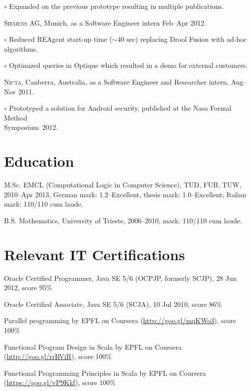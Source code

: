 \documentclass[letterpaper]{article}
\renewenvironment{itemize}{
  \begin{list}{}{
    \setlength{\leftmargin}{1.5em}
  }
}{
  \end{list}
}
\newenvironment{no-indent-itemize}{
  \begin{list}{}{
    \setlength{\leftmargin}{0em}
  }
}{
  \end{list}
}
\def\tilde{$\scriptstyle\sim$}
\def\bullet{$\circ$\xspace}
\begin{document}
\begin{no-indent-itemize}
\begin{itemize}
	 \item\bullet Expanded on the previous prototype resulting in multiple publications.
  \end{itemize}
  \item \textsc{Siemens AG}, Munich, as a Software Engineer intern Feb--Apr 2012.
  \begin{itemize}
     \item\bullet Reduced REAgent start-up time (\tilde 40 sec) replacing Drool Fusion with 
           ad-hoc algorithms.
     \item\bullet Optimized queries in Optique which resulted in a demo for external customers.
  \end{itemize}
  \item \textsc{Nicta}, Canberra, Australia, as a Software Engineer and Researcher intern, Aug--Nov 2011. 
  \begin{itemize}
	\item\bullet Prototyped a solution for Android security, published at the Nasa Formal Method \\
	\phantom{\bullet }Symposium~2012.
  \end{itemize}
\end{no-indent-itemize}

\section*{Education}
\begin{no-indent-itemize}
  \item M.Sc. EMCL (Computational Logic in Computer Science), TUD, FUB, TUW, 2010--Apr 2013, 
        German mark: 1.2--Excellent, thesis mark: 1.0--Excellent; Italian mark: 110/110 cum laude.
  \item B.S. Mathematics, University of Trieste, 2006--2010, mark: 110/110 cum laude. 
\end{no-indent-itemize}

\section*{Relevant IT Certifications}
\begin{no-indent-itemize}
  \item Oracle Certified Programmer, Java SE 5/6 (OCPJP, formerly SCJP), 28 Jun 2012, score 95\%
  \item Oracle Certified Associate, Java SE 5/6 (SCJA), 10 Jul 2010, score 86\%
  \item Parallel programming by EPFL on Coursera 
        (\href{http://goo.gl/mqKWo3}{http://goo.gl/mqKWo3}), score 100\%
  \item Functional Program Design in Scala by EPFL on Coursera 
        (\href{https://goo.gl/vP9Kkf}{http://goo.gl/rrRViR}), score 100\%
  \item Functional Programming Principles in Scala by EPFL on Coursera 
        (\href{https://goo.gl/vP9Kkf}{https://goo.gl/vP9Kkf}), score 100\%
\end{no-indent-itemize}
\end{document}
